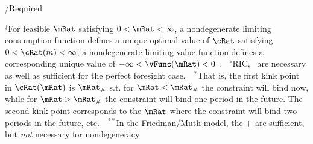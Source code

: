 \documentclass[\econtexRoot/BufferStockTheory]{subfiles}
\begin{document}
\begin{verbatimwrite}{\TableDir/Required}
\begin{table}
\settowidth\TableWidth{\usebox{\Required}}
\usebox{\Required}

\parbox{\TableWidth}{\footnotesize         $^{\ddagger}$For feasible $\mRat$ satisfying $0 < \mRat < \infty$, a nondegenerate limiting consumption function defines a unique optimal value of $\cRat$ satisfying $0 < \cRat(m) < \infty$; a nondegenerate limiting value function defines a corresponding unique value of $-\infty < \vFunc(\mRat) < 0$ .~~$^{\circ}$RIC, \FHWC~are necessary as well as sufficient for the perfect foresight case.~~$^{\ast}$That is, the first kink point in $\cRat(\mRat)$ is $\mRat_{\#}$ s.t. for $\mRat < \mRat_{\#}$ the constraint will bind now, while for $\mRat > \mRat_{\#}$ the constraint will bind one period in the future.  The second kink point corresponds to the $\mRat$ where the constraint will bind two periods in the future, etc.~~$^{\ast\ast}$In the Friedman/Muth model, the {\RIC}+{\FHWC} are sufficient, but \textit{not} necessary for nondegeneracy} 
\end{table}
    
\end{verbatimwrite}
\clearpage

\end{document}
